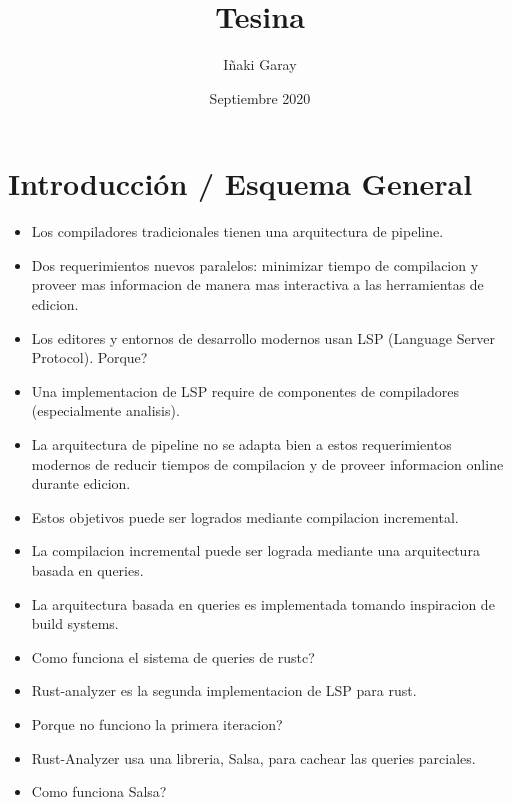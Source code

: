 \documentclass[12pt, a4paper]{report}
\title{Tesina}
\author{Iñaki Garay}
\date{Septiembre 2020}
\begin{document}
\begin{titlepage}
\maketitle
\thispagestyle{empty}
\end{titlepage}

\tableofcontents
\thispagestyle{empty}

\newpage

\chapter*{Introducción / Esquema General}

\begin{itemize}[noitemsep]

\item Los compiladores tradicionales tienen una arquitectura de pipeline.

\item Dos requerimientos nuevos paralelos: minimizar tiempo de compilacion y proveer mas informacion de manera mas interactiva a las herramientas de edicion.

\item Los editores y entornos de desarrollo modernos usan LSP (Language Server Protocol). Porque?

\item Una implementacion de LSP require de componentes de compiladores (especialmente analisis).

\item La arquitectura de pipeline no se adapta bien a estos requerimientos modernos de reducir tiempos de compilacion y de proveer informacion online durante edicion.

\item Estos objetivos puede ser logrados mediante compilacion incremental.

\item La compilacion incremental puede ser lograda mediante una arquitectura basada en queries.

\item La arquitectura basada en queries es implementada tomando inspiracion de build systems.

\item Como funciona el sistema de queries de rustc?

\item Rust-analyzer es la segunda implementacion de LSP para rust.

\item Porque no funciono la primera iteracion?

\item Rust-Analyzer usa una libreria, Salsa, para cachear las queries parciales.

\item Como funciona Salsa?

\end{itemize}
\end{document}
